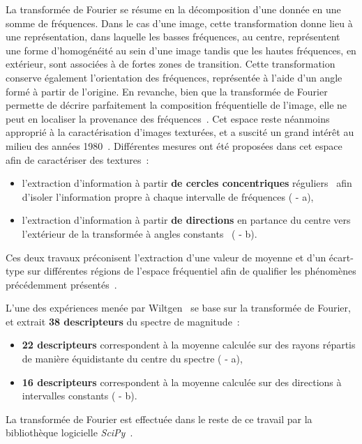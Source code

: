 La transformée de Fourier se résume en la décomposition d'une donnée en une somme de fréquences. Dans le cas d'une image, cette transformation donne lieu à une représentation, dans laquelle les basses fréquences, au centre, représentent une forme d'homogénéité au sein d'une image tandis que les hautes fréquences, en extérieur, sont associées à de fortes zones de transition. Cette transformation conserve également l'orientation des fréquences, représentée à l'aide d'un angle formé à partir de l'origine. En revanche, bien que la transformée de Fourier permette de décrire parfaitement la composition fréquentielle de l'image, elle ne peut en localiser la provenance des fréquences~\cite{Wiltgen2008}. Cet espace reste néanmoins approprié à la caractérisation d'images texturées, et a suscité un grand intérêt au milieu des années 1980~\cite{Persoon1986}. Différentes mesures ont été proposées dans cet espace afin de caractériser des textures~:
\begin{itemize}
    \item l'extraction d'information à partir \textbf{de cercles concentriques} réguliers~\cite{Smach2008a, Wiltgen2008} afin d'isoler l'information propre à chaque intervalle de fréquences ( - a),
    \item l'extraction d'information à partir \textbf{de directions} en partance du centre vers l'extérieur de la transformée à angles constants~\cite{Wiltgen2008} ( - b).
\end{itemize}
Ces deux travaux préconisent l'extraction d'une valeur de moyenne et d'un écart-type sur différentes régions de l'espace fréquentiel afin de qualifier les phénomènes précédemment présentés~\cite{Smach2008a, Wiltgen2008}. 

L'une des expériences menée par Wiltgen~ se base sur la transformée de Fourier, et extrait \textbf{38 descripteurs} du spectre de magnitude~:
\begin{itemize}
    \item \textbf{22 descripteurs} correspondent à la moyenne calculée sur des rayons répartis de manière équidistante du centre du spectre ( - a),
    \item \textbf{16 descripteurs} correspondent à la moyenne calculée sur des directions à intervalles constants ( - b).
\end{itemize}
La transformée de Fourier est effectuée dans le reste de ce travail par la bibliothèque logicielle \textit{SciPy}~\cite{Virtanen2020}.\par

